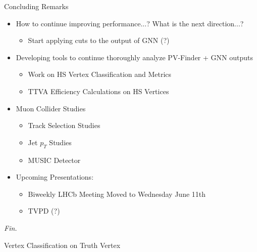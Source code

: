 \documentclass[xcolor=table,aspectratio=169]{beamer}
\begin{document}
\begin{frame}{Concluding Remarks}
    \begin{itemize}
        \item How to continue improving performance...? What is the next direction...?
        \begin{itemize}
            \item Start applying cuts to the output of GNN (?)
        \end{itemize}
        \item Developing tools to continue thoroughly analyze PV-Finder + GNN outputs
        \begin{itemize}
            \item Work on HS Vertex Classification and Metrics
            \item TTVA Efficiency Calculations on HS Vertices
        \end{itemize}
        \item Muon Collider Studies
        \begin{itemize}
            \item Track Selection Studies
            \item Jet \(p_T\) Studies
            \item MUSIC Detector
        \end{itemize}
        \item Upcoming Presentations:
        \begin{itemize}
            \item Biweekly LHCb Meeting Moved to Wednesday June 11th
            \item TVPD (?)
        \end{itemize}
    \end{itemize}

    \centering
    \textit{Fin.}
\end{frame}


\begin{frame}[plain]
    \centering
    Vertex Classification on Truth Vertex
\end{frame}
\end{document}
